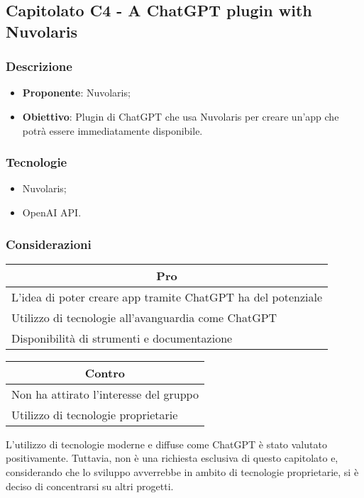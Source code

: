 \subsection{Capitolato C4 - A ChatGPT plugin with Nuvolaris}


\subsubsection{Descrizione}
\begin{itemize}
    \item \textbf{Proponente}: Nuvolaris;
    \item \textbf{Obiettivo}: Plugin di ChatGPT che usa Nuvolaris per 
		creare un'app che potrà essere immediatamente disponibile.
\end{itemize}


\subsubsection{Tecnologie}
\begin{itemize}
    \item Nuvolaris;
    \item OpenAI API.
\end{itemize}


\subsubsection{Considerazioni}
\begin{minipage}[t]{0.45\linewidth}
    \vspace{0pt}
    {\renewcommand{\arraystretch}{1.5}
    \begin{tabular}{p{1\linewidth}}
        \multicolumn{1}{c}{\textbf{Pro}} \\
        \midrule
        L'idea di poter creare app tramite ChatGPT ha del potenziale \\
        Utilizzo di tecnologie all'avanguardia come ChatGPT \\
        Disponibilità di strumenti e documentazione \\
        \hline
    \end{tabular}
    }
\end{minipage}
\hspace{0.05\linewidth}
\begin{minipage}[t]{0.45\linewidth}
    \vspace{0pt}
    {\renewcommand{\arraystretch}{1.5}
    \begin{tabular}{p{1\linewidth}}
        \multicolumn{1}{c}{\textbf{Contro}} \\
        \midrule
        Non ha attirato l'interesse del gruppo \\
        Utilizzo di tecnologie proprietarie \\
        \hline
    \end{tabular}
    }
\end{minipage}
\vspace{1em}

L'utilizzo di tecnologie moderne e diffuse come ChatGPT è stato valutato 
positivamente. Tuttavia, non è una richiesta esclusiva di questo 
capitolato e, considerando che lo sviluppo avverrebbe in ambito di tecnologie 
proprietarie, si è deciso di concentrarsi su altri progetti.

